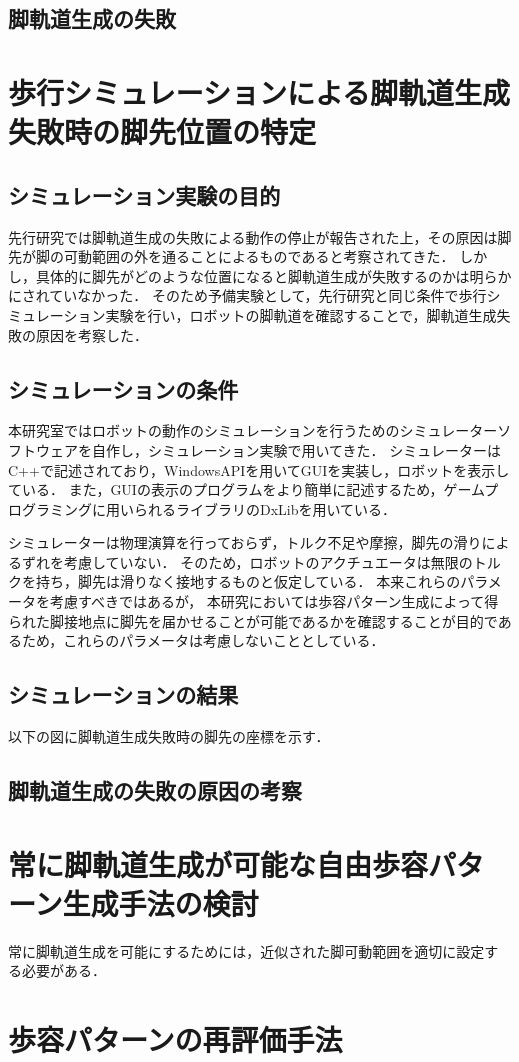 \subsection{脚軌道生成の失敗}


\section{歩行シミュレーションによる脚軌道生成失敗時の脚先位置の特定}

\subsection{シミュレーション実験の目的}
先行研究では脚軌道生成の失敗による動作の停止が報告された上，その原因は脚先が脚の可動範囲の外を通ることによるものであると考察されてきた．
しかし，具体的に脚先がどのような位置になると脚軌道生成が失敗するのかは明らかにされていなかった．
そのため予備実験として，先行研究と同じ条件で歩行シミュレーション実験を行い，ロボットの脚軌道を確認することで，脚軌道生成失敗の原因を考察した．

\subsection{シミュレーションの条件}
本研究室ではロボットの動作のシミュレーションを行うためのシミュレーターソフトウェアを自作し，シミュレーション実験で用いてきた．
シミュレーターはC++で記述されており，WindowsAPIを用いてGUIを実装し，ロボットを表示している．
また，GUIの表示のプログラムをより簡単に記述するため，ゲームプログラミングに用いられるライブラリのDxLibを用いている．

シミュレーターは物理演算を行っておらず，トルク不足や摩擦，脚先の滑りによるずれを考慮していない．
そのため，ロボットのアクチュエータは無限のトルクを持ち，脚先は滑りなく接地するものと仮定している．
本来これらのパラメータを考慮すべきではあるが，
本研究においては歩容パターン生成によって得られた脚接地点に脚先を届かせることが可能であるかを確認することが目的であるため，これらのパラメータは考慮しないこととしている．

\subsection{シミュレーションの結果}
以下の図に脚軌道生成失敗時の脚先の座標を示す．

\subsection{脚軌道生成の失敗の原因の考察}

\section{常に脚軌道生成が可能な自由歩容パターン生成手法の検討}
常に脚軌道生成を可能にするためには，近似された脚可動範囲を適切に設定する必要がある．


\section{歩容パターンの再評価手法}


